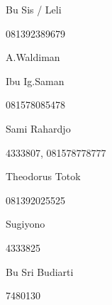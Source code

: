 \documentclass{article}
\begin{document}
\begin{figure}
\centering
\begin{minipage}{2.969cm}
Bu Sis / Leli

081392389679

\end{minipage}
\end{figure}
\begin{figure}
\centering
\begin{minipage}{2.768cm}
A.Waldiman
\end{minipage}
\end{figure}
\begin{figure}
\centering
\begin{minipage}{3.069cm}
Ibu Ig.Saman

081578085478

\end{minipage}
\end{figure}
\begin{figure}
\centering
\begin{minipage}{3.17cm}
Sami Rahardjo

4333807, 081578778777

\end{minipage}
\end{figure}
\begin{figure}
\centering
\begin{minipage}{3.27cm}
Theodorus Totok 

081392025525
\end{minipage}
\end{figure}
\begin{figure}
\centering
\begin{minipage}{2.868cm}
Sugiyono

4333825

\end{minipage}
\end{figure}
\begin{figure}
\centering
\begin{minipage}{3.17cm}
Bu Sri Budiarti

7480130 

\end{minipage}
\end{figure}
\end{document}
